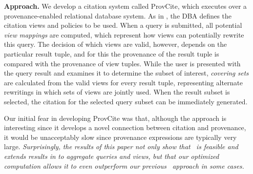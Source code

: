 \newpage
\textbf{Approach.} We develop a citation system called ProvCite, which executes over a provenance-enabled relational database system.  %
As in \cite{wu2018data}, the DBA defines the citation views and policies to be used.  When a query is submitted, all potential {\em view mappings} are computed, which represent how views can potentially rewrite this query.  The decision of which views are valid, however, depends on the particular result tuple, and for this the provenance of the result tuple is compared with the provenance of view tuples. While the user is presented with the query result and examines it to determine the subset of interest, \textit{covering sets} are calculated from the valid views for every result tuple, representing alternate rewritings in which sets of views are jointly used. When the result subset is selected, the citation for the selected query subset can be immediately generated.   

Our initial fear in developing ProvCite was that, although the approach is interesting since it develops a novel connection between citation and provenance, it would be unacceptably slow since provenance expressions are typically very large. \textit{Surprisingly, the results of this paper not only show that \pba\ is feasible and extends results in \cite{wu2018data} to aggregate queries and views, but that our optimized computation allows it to even outperform our previous \rba\ approach in some cases.} 

